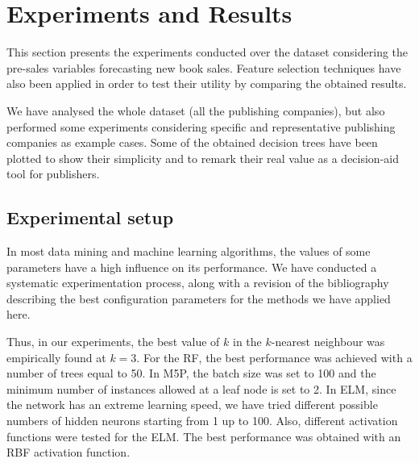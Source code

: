 \documentclass[a4paper,10pt,twocolumn,preprint,3p]{elsarticle}
\begin{document}
\section{Experiments and Results}
\label{sec:experiments}

This section presents the experiments conducted over the dataset considering the 
pre-sales variables forecasting new book sales.
Feature selection techniques have also been applied in order to test their utility by comparing the obtained results.

We have analysed the whole dataset (all the publishing companies), but also 
performed some experiments considering specific and representative publishing 
companies as example cases.
Some of the obtained decision trees have been plotted to show their simplicity 
and to remark their real value as a decision-aid tool for publishers.


\subsection{Experimental setup}

In most data mining and machine learning algorithms, the values of some 
parameters have a high influence on its performance. We have conducted a 
systematic experimentation process, along with a revision of the bibliography 
describing the best configuration parameters for the methods we have applied here. 

Thus, in our experiments, the best value of $k$ in the $k$-nearest neighbour 
was empirically found at $k=3$. For the RF, the best performance was achieved with a number of trees equal to 50. In M5P, the batch size was set to 100 and the minimum number of instances allowed at a leaf node is set to 2. In ELM, since the network has an extreme learning speed, we have tried different possible numbers of hidden neurons starting from 1 up to 100. Also, different activation functions were tested for the ELM. The best performance was obtained with an RBF activation function.
\end{document}
